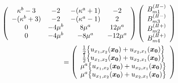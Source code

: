 \begin{align}
	\left(
	\begin{array}{cccc}
		\kappa^b-3& -2 & -(\kappa^a+1) & -2 \\
		-(\kappa^b+3) & -2 & -(\kappa^a-1) & 2 \\
		0 & -4\mu^{b} & 8\mu^{a} & 12\mu^{a} \\
		0 & -4\mu^{b} & -8\mu^{a} & -12\mu^{a} \\
	\end{array}
	\right)
	\left(
	\begin{array}{c}
		B_{m1}^{(I\hspace{-.15em}I-)} \\
	 	B_{m3}^{(I\hspace{-.15em}I-)} \\
		B_{m2}^{(I\hspace{-.15em}I+)}\\
	 	B_{m4}^{(I\hspace{-.15em}I+)} \\
	\end{array}
	\right)
	\nonumber
	\\
	=
	\left(
	\begin{array}{c}
		\frac{1}{2}\bigl\{u_{x_{1},x_{2}}(\bm{x_{0}})+u_{x_{2},x_{1}}(\bm{x_{0}})\bigr\} \\
	 	\frac{1}{2}\bigl\{u_{x_{1},x_{2}}(\bm{x_{0}})+u_{x_{2},x_{1}}(\bm{x_{0}})\bigr\} \\
		\mu^a\bigl\{u_{x_{1},x_{2}}(\bm{x_{0}})+u_{x_{2},x_{1}}(\bm{x_{0}})\bigr\} \\
	 	\mu^a \bigl\{u_{x_{1},x_{2}}(\bm{x_{0}})+u_{x_{2},x_{1}}(\bm{x_{0}})\bigr\} \\
	\end{array}
	\right)
\end{align}

